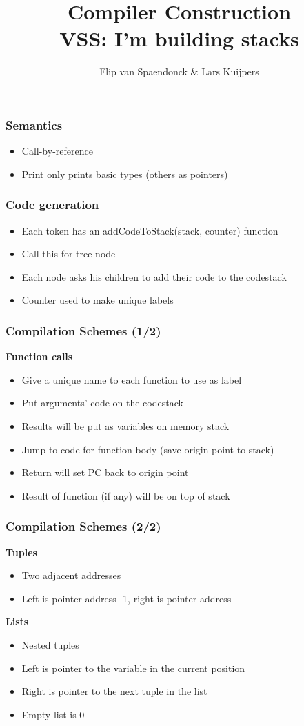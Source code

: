 \documentclass{beamer}
\author[Flip \& Lars]{Flip van Spaendonck \& Lars Kuijpers}
\title{Compiler Construction \\ \lbrack VSS\rbrack : I'm building stacks }
\begin{document}
\begin{frame}
\titlepage
\end{frame}

\begin{frame}
\frametitle{Semantics}
\begin{itemize}
\item Call-by-reference
\item Print only prints basic types (others as pointers)
\end{itemize}
\end{frame}

\begin{frame}
\frametitle{Code generation}
\begin{itemize}
\item Each token has an addCodeToStack(stack, counter) function
\item Call this for tree node
\item Each node asks his children to add their code to the codestack
\item Counter used to make unique labels
\end{itemize}
\end{frame}

\begin{frame}
\frametitle{Compilation Schemes (1/2)}
\textbf{Function calls}
\begin{itemize}
\item Give a unique name to each function to use as label
\item Put arguments' code on the codestack 
\item Results will be put as variables on memory stack
\item Jump to code for function body (save origin point to stack)
\item Return will set PC back to origin point
\item Result of function (if any) will be on top of stack
\end{itemize}
\end{frame}

\begin{frame}
\frametitle{Compilation Schemes (2/2)}
\textbf{Tuples}
\begin{itemize}
\item Two adjacent addresses
\item Left is pointer address -1, right is pointer address
\end{itemize}

\textbf{Lists}
\begin{itemize}
\item Nested tuples
\item Left is pointer to the variable in the current position
\item Right is pointer to the next tuple in the list
\item Empty list is 0
\end{itemize}
\end{frame}
\end{document}
